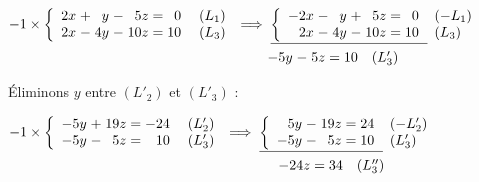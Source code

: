 \documentclass[12pt,a4paper]{article}
\begin{document}
\begin{enumerate}
\vspace{0.4cm}
\noindent
\(
\begin{aligned}
-1 \times
\left\{
\begin{array}{r@{\;}c@{\;}r@{\;}c@{\;}r@{\;=\;}r}
2x & + &  y & - &  5z &  0 \\
2x & - & 4y & - & 10z & 10
\end{array}
\right.
\begin{array}{l}
(L_1) \\
(L_3)
\end{array}
&\implies
\underline{
\left\{
\begin{array}{r@{\;}c@{\;}r@{\;}c@{\;}r@{\;=\;}r}
-2x & - &  y & + &  5z &  0 \\
 2x & - & 4y & - & 10z & 10
\end{array}
\right.
}
\begin{array}{l}
(-L_1) \\
(L_3)
\end{array} \\
&\qquad
\begin{array}{r@{\;}c@{\;}r@{\;=\;}r@{\quad}l}
-5y & - & 5z & 10 & (L'_3)
\end{array}
\end{aligned}
\)

\vspace{0.4cm}
\noindent
Éliminons $y$ entre $(L'_2)$ et $(L'_3)$ :

\vspace{0.3cm}
\noindent
\(
\begin{aligned}
-1 \times
\left\{
\begin{array}{r@{\;}c@{\;}r@{\;=\;}r}
-5y & + & 19z & -24 \\
-5y & - &  5z &  10
\end{array}
\right.
\begin{array}{l}
(L'_2) \\
(L'_3)
\end{array}
&\implies
\underline{
\left\{
\begin{array}{r@{\;}c@{\;}r@{\;=\;}r}
 5y & - & 19z & 24 \\
-5y & - &  5z & 10
\end{array}
\right.
}
\begin{array}{l}
(-L'_2) \\
(L'_3)
\end{array} \\
&\qquad
\begin{array}{r@{\;}c@{\;}r@{\;=\;}r@{\quad}l}
\phantom{5y} & & -24z & 34 & (L''_3)
\end{array}
\end{aligned}
\)


\end{enumerate}
\end{document}
